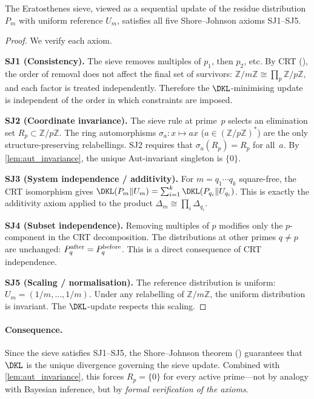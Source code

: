 \documentclass[12pt,a4paper]{article}
\begin{document}
\begin{lemma}
\label{lem:SJ_sieve}
The Eratosthenes sieve, viewed as a sequential update of the residue
distribution $P_m$ with uniform reference $U_m$, satisfies all five
Shore--Johnson axioms SJ1--SJ5.

\begin{proof}
We verify each axiom.

\textbf{SJ1 (Consistency).}
The sieve removes multiples of $p_1$, then $p_2$, etc.  By CRT
(\cite{companion_M1}), the order of removal does not affect the final
set of survivors: $\mathbb{Z}/m\mathbb{Z} \cong
\prod_p \mathbb{Z}/p\mathbb{Z}$, and each factor is treated
independently.  Therefore the $\DKL$-minimising update is
independent of the order in which constraints are imposed.

\textbf{SJ2 (Coordinate invariance).}
The sieve rule at prime~$p$ selects an elimination set $R_p \subset
\mathbb{Z}/p\mathbb{Z}$.  The ring automorphisms $\sigma_a : x \mapsto
ax$ ($a \in (\mathbb{Z}/p\mathbb{Z})^*$) are the only structure-preserving
relabellings.  SJ2 requires that $\sigma_a(R_p) = R_p$ for all~$a$.
By \cref{lem:aut_invariance}, the unique Aut-invariant singleton is $\{0\}$.

\textbf{SJ3 (System independence / additivity).}
For $m = q_1 \cdots q_k$ square-free, the CRT isomorphism gives
$\DKL(P_m \| U_m) = \sum_{i=1}^k \DKL(P_{q_i} \| U_{q_i})$.
This is exactly the additivity axiom applied to the product
$\Delta_m \cong \prod_i \Delta_{q_i}$.

\textbf{SJ4 (Subset independence).}
Removing multiples of $p$ modifies only the $p$-component
in the CRT decomposition.  The distributions at other primes
$q \neq p$ are unchanged: $P_{q}^{\rm after} = P_{q}^{\rm before}$.
This is a direct consequence of CRT independence.

\textbf{SJ5 (Scaling / normalisation).}
The reference distribution is uniform: $U_m = (1/m, \ldots, 1/m)$.
Under any relabelling of $\mathbb{Z}/m\mathbb{Z}$, the uniform
distribution is invariant.  The $\DKL$-update respects this scaling.
\end{proof}
\end{lemma}

\paragraph{Consequence.}
Since the sieve satisfies SJ1--SJ5, the Shore--Johnson theorem
(\cite{ShoreJohnson1980}) guarantees that $\DKL$ is the unique
divergence governing the sieve update.  Combined with
\cref{lem:aut_invariance}, this forces $R_p = \{0\}$ for every
active prime---not by analogy with Bayesian inference, but by
\emph{formal verification of the axioms}.
\end{document}

